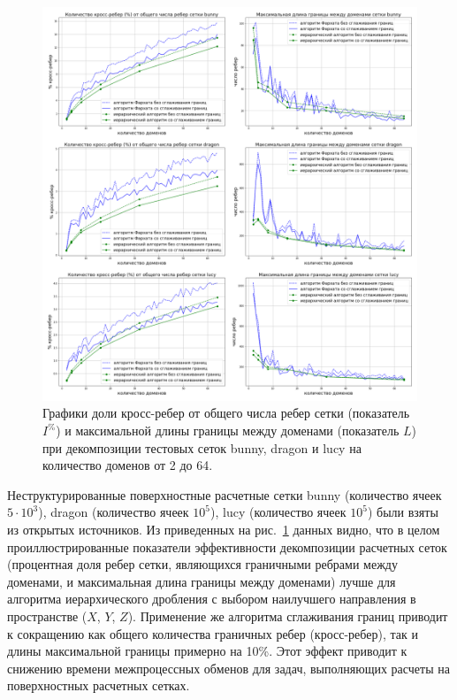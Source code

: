 \begin{figure}[H]
\centering
\includegraphics[width=1.0\textwidth]{./pics/text_2_smooth/graphics.pdf}
\singlespacing
{}\caption{Графики доли кросс-ребер\label{term:edge_cross3} от общего числа ребер сетки (показатель $I^{\%}$\label{term:decomp_sumbord5}) и максимальной длины границы между доменами (показатель $L$\label{term:decomp_maxbord5}) при декомпозиции тестовых сеток bunny, dragon и lucy на количество доменов от 2 до 64.}
\label{fig:text_2_smooth_graphics}
\end{figure}

Неструктурированные поверхностные расчетные сетки bunny (количество ячеек $5 \cdot 10^3$), dragon (количество ячеек $10^5$), lucy (количество ячеек $10^5$) были взяты из открытых источников.
Из приведенных на рис.~\ref{fig:text_2_smooth_graphics} данных видно, что в целом проиллюстрированные показатели эффективности декомпозиции расчетных сеток (процентная доля ребер сетки, являющихся граничными ребрами между доменами, и максимальная длина границы между доменами) лучше для алгоритма иерархического дробления с выбором наилучшего направления в пространстве ($X$, $Y$, $Z$).
Применение же алгоритма сглаживания границ приводит к сокращению как общего количества граничных ребер (кросс-ребер), так и длины максимальной границы примерно на 10\%.
Этот эффект приводит к снижению времени межпроцессных обменов для задач, выполняющих расчеты на поверхностных расчетных сетках\label{term:unstruct_surf_calc_mesh4}.


